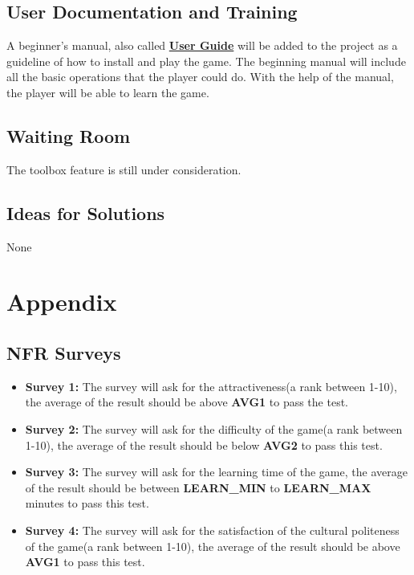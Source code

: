 \documentclass[12pt, titlepage]{article}
\begin{document}
\subsection{User Documentation and Training}
A beginner's manual, also called \href{https://gitlab.cas.mcmaster.ca/wangs132/minecraft/-/blob/master/Doc/UserGuide/UserGuide.pdf}{ \bf User Guide} will be added to the project as a guideline of how to install and play the game. The beginning manual will include all the basic operations that the player could do. With the help of the manual, the player will be able to learn the game.
\subsection{Waiting Room}
The toolbox feature is still under consideration.
\subsection{Ideas for Solutions}
None




\newpage

\section{Appendix}

\subsection{NFR Surveys}


\begin{itemize}
        \item \textbf{Survey 1:}\label{s1} The survey will ask for the attractiveness(a rank between 1-10), the average of the result should be above \textbf{AVG1} to pass the test.
        \item \textbf{Survey 2:}\label{s2} The survey will ask for the difficulty of the game(a rank between 1-10), the average of the result should be below \textbf{AVG2} to pass this test.
        \item \textbf{Survey 3:}\label{s3} The survey will ask for the learning time of the game, the average of the result should be between \textbf{LEARN\_MIN} to \textbf{LEARN\_MAX} minutes to pass this test.
        \item \textbf{Survey 4:}\label{s4}  The survey will ask for the satisfaction of the cultural politeness of the game(a rank between 1-10), the average of the result should be above \textbf{AVG1} to pass this test.
\end{itemize}
\end{document}
